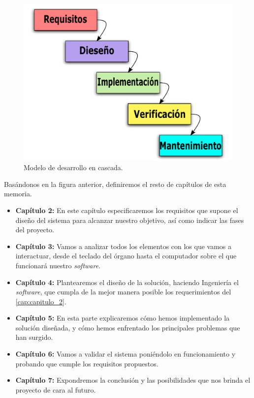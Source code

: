 \begin{figure}[H]
	\noindent \begin{centering}
		\includegraphics[width=\linewidth/2]{capitulo1/figura12}
		\par\end{centering}
	\smallskip
	\caption{\label{fig:figura12} Modelo de desarrollo en cascada.}
\end{figure} 

\smallskip

Basándonos en la figura anterior, definiremos el resto de capítulos de esta memoria.

\begin{itemize}

\item \textbf{Capítulo 2:} En este capítulo especificaremos los requisitos que supone el diseño del sistema para alcanzar nuestro objetivo, así como indicar las fases del proyecto.

\item \textbf{Capítulo 3:} Vamos a analizar todos los elementos con los que vamos a interactuar, desde el teclado del órgano hasta el computador sobre el que funcionará nuestro \textit{software}. 

\item \textbf{Capítulo 4:} Plantearemos el diseño de la solución, haciendo Ingeniería el \textit{software}, que cumpla de la mejor manera posible los requerimientos del \ref{cap:capitulo_2}.

\item \textbf{Capítulo 5:} En esta parte explicaremos cómo hemos implementado la solución diseñada, y cómo hemos enfrentado los principales problemas que han surgido.

\item \textbf{Capítulo 6:} Vamos a validar el sistema poniéndolo en funcionamiento y probando que cumple los requisitos propuestos.

\item \textbf{Capítulo 7:} Expondremos la conclusión y las posibilidades que nos brinda el proyecto de cara al futuro.
  
\end{itemize}

\newpage
\clearpage{\pagestyle{empty}\cleardoublepage}
